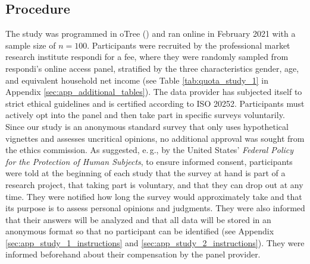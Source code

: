 \documentclass[egregdoesnotlikesansseriftitles]{scrartcl}
\begin{document}
\subsection{Procedure}\label{sec:study_1_procedure}
The study was programmed in oTree (\citealt{chen_otree_2016}) and ran online in February 2021 with a sample size of $n = 100$.
Participants were recruited by the professional market research institute respondi for a fee, where they were randomly sampled from respondi's online access panel, stratified by the three characteristics gender, age, and equivalent household net income (see Table \ref{tab:quota_study_1} in Appendix \ref{sec:app_additional_tables}).
The data provider has subjected itself to strict ethical guidelines and is certified according to ISO 20252.
Participants must actively opt into the panel and then take part in specific surveys voluntarily.
Since our study is an anonymous standard survey that only uses hypothetical vignettes and assesses uncritical opinions, no additional approval was sought from the ethics commission.
As suggested, e.\,g., by the United States' \textit{Federal Policy for the Protection of Human Subjects}, to ensure informed consent, participants were told at the beginning of each study that the survey at hand is part of a research project, that taking part is voluntary, and that they can drop out at any time.
They were notified how long the survey would approximately take and that its purpose is to assess personal opinions and judgments.
They were also informed that their answers will be analyzed and that all data will be stored in an anonymous format so that no participant can be identified (see Appendix \ref{sec:app_study_1_instructions} and \ref{sec:app_study_2_instructions}).
They were informed beforehand about their compensation by the panel provider.
\end{document}
